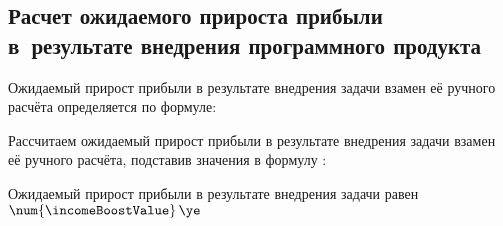 \subsection{Расчет ожидаемого прироста прибыли в~результате внедрения программного продукта}
\label{sec:economics:icomeBoost}

Ожидаемый прирост прибыли в результате внедрения задачи взамен её ручного расчёта определяется по формуле:
\incomeBoostEquation

Рассчитаем ожидаемый прирост прибыли в результате внедрения задачи взамен её ручного расчёта, подставив значения в формулу :
\incomeBoostFormulaApplied

Ожидаемый прирост прибыли в результате внедрения задачи равен \(\num{\incomeBoostValue} \, \ye\)